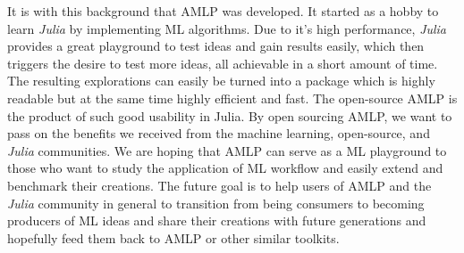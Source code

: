 \documentclass{juliacon}
\begin{document}
It is with this background that AMLP was developed. It started as a hobby to
learn \emph{Julia} by implementing ML algorithms.
Due to it's high performance, \emph{Julia} provides a great
playground to test ideas and gain results easily,
which then triggers the desire to test more ideas, all achievable in a short amount of time.
The resulting explorations can easily be turned into a package which is highly
readable but at the same time highly efficient and fast.  The open-source
AMLP is the product of such good usability in Julia. By open sourcing
AMLP, we want to pass on the benefits we received from the machine
learning, open-source, and \emph{Julia} communities. We are hoping
that AMLP can serve as a ML playground to those who want to
study the application of ML workflow and easily extend and benchmark their
creations. The future goal is to help users of AMLP and the \emph{Julia} community
in general to transition from being consumers to becoming producers of ML ideas
and share their creations with future generations and hopefully feed them back to AMLP
or other similar toolkits.

\vskip 6pt



\end{document}
